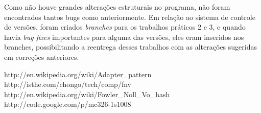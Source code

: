\documentclass[a4paper,10pt]{article}
\begin{document}
Como não houve grandes alterações estruturais no programa, não foram encontrados tantos bugs como anteriormente. Em relação ao sistema de controle de versões, foram criados \textit{branches} para os trabalhos práticos 2 e 3, e quando havia \textit{bug fixes} importantes para alguma das versões, eles eram inseridos nos branches, possibilitando a reentrega desses trabalhos com as alterações sugeridas em correções anteriores.

\begin{thebibliography}{99}
 http://en.wikipedia.org/wiki/Adapter\_pattern
 http://isthe.com/chongo/tech/comp/fnv
 http://en.wikipedia.org/wiki/Fowler\_Noll\_Vo\_hash
 http://code.google.com/p/mc326-1s1008
\end{thebibliography}
\end{document}

